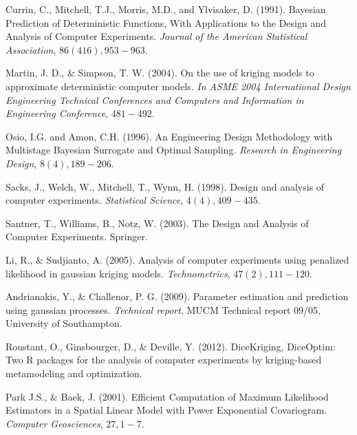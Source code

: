 \documentclass[12pt,titlepage]{report}
\theoremstyle{definition}
\theoremstyle{remark}
\begin{document}


\begin{thebibliography}{94}


 Currin, C., Mitchell, T.J., Morris, M.D., and Ylvisaker, D. (1991). Bayesian Prediction of Deterministic Functions, With Applications to the Design and Analysis of Computer Experiments. {\it Journal of the American Statistical Association}, $86(416), 953-963$. 

 Martin, J. D., \& Simpson, T. W. (2004). On the use of kriging models to approximate deterministic computer models. {\it In ASME 2004 International Design Engineering Technical Conferences and Computers and Information in Engineering Conference}, $481-492$.

 Osio, I.G. and Amon, C.H. (1996). An Engineering Design Methodology with Multistage Bayesian Surrogate and Optimal Sampling. {\it Research in Engineering Design}, $8(4), 189-206$.

 Sacks, J., Welch, W., Mitchell, T., Wynn, H. (1998). Design and analysis of computer experiments. {\it Statistical Science}, $4(4), 409-435$.

 Santner, T., Williams, B., Notz, W. (2003). The Design and Analysis of Computer Experiments. Springer.

 Li, R., \& Sudjianto, A. (2005). Analysis of computer experiments using penalized likelihood in gaussian kriging models. {\it Technometrics}, $47(2), 111-120$.

 Andrianakis, Y., \& Challenor, P. G. (2009). Parameter estimation and prediction using gaussian processes. {\it Technical report}, MUCM Technical report 09/05, University of Southampton.

 Roustant, O., Ginsbourger, D., \& Deville, Y. (2012). DiceKriging, DiceOptim: Two R packages for the analysis of computer experiments by kriging-based metamodeling and optimization.

 Park J.S., \& Baek, J. (2001). Efficient Computation of Maximum Likelihood Estimators in a
Spatial Linear Model with Power Exponential Covariogram. {\it Computer Geosciences}, $27, 1-7$.


\end{thebibliography}
\end{document}
